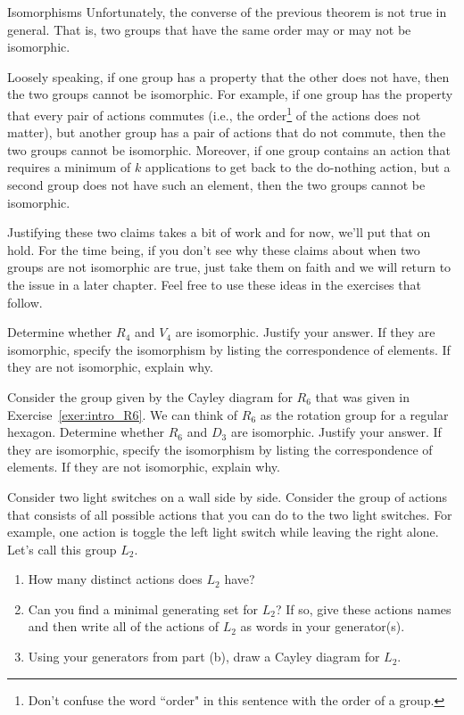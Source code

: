 \begin{section}{Isomorphisms}
Unfortunately, the converse of the previous theorem is not true in general.  That is, two groups that have the same order may or may not be isomorphic.

Loosely speaking, if one group has a property that the other does not have, then the two groups cannot be isomorphic.  For example, if one group has the property that every pair of actions commutes (i.e., the order\footnote{Don't confuse the word ``order" in this sentence with the order of a group.} of the actions does not matter), but another group has a pair of actions that do not commute, then the two groups cannot be isomorphic.  Moreover, if one group contains an action that requires a minimum of $k$ applications to get back to the do-nothing action, but a second group does not have such an element, then the two groups cannot be isomorphic.  

Justifying these two claims takes a bit of work and for now, we'll put that on hold.  For the time being, if you don't see why these claims about when two groups are not isomorphic are true, just take them on faith and we will return to the issue in a later chapter.  Feel free to use these ideas in the exercises that follow.

\begin{problem}\label{exer:R4vsV4}
Determine whether $R_4$ and $V_4$ are isomorphic.  Justify your answer.  If they are isomorphic, specify the isomorphism by listing the correspondence of elements.  If they are not isomorphic, explain why.
\end{problem}

\begin{problem}\label{prob:R6_not_iso_D3}
Consider the group given by the Cayley diagram for $R_6$ that was given in Exercise~\ref{exer:intro_R6}.  We can think of $R_6$ as the rotation group for a regular hexagon.  Determine whether $R_6$ and $D_3$ are isomorphic.  Justify your answer.  If they are isomorphic, specify the isomorphism by listing the correspondence of elements.  If they are not isomorphic, explain why.
\end{problem}

\begin{exercise}
Consider two light switches on a wall side by side.  Consider the group of actions that consists of all possible actions that you can do to the two light switches.  For example, one action is toggle the left light switch while leaving the right alone.  Let's call this group $L_2$.
\begin{enumerate}[label=\rm{(\alph*)}]
\item How many distinct actions does $L_2$ have?
\item Can you find a minimal generating set for $L_2$?  If so, give these actions names and then write all of the actions of $L_2$ as words in your generator(s).
\item Using your generators from part (b), draw a Cayley diagram for $L_2$.
\end{enumerate}
\end{exercise}


\end{section}
